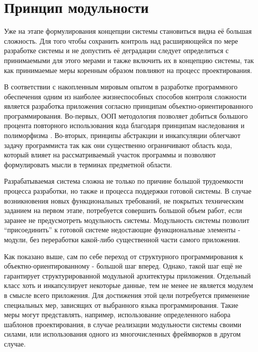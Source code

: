 \documentclass[14pt,oneside,final]{extreport}
\begin{document}
	\section{Принцип модульности}
	Уже на этапе формулирования концепции системы становиться видна её большая сложность. Для того чтобы сохранить контроль над расширяющейся по мере разработке системы и не допустить её деградации следует определиться с принимаемыми для этого мерами и также включить их в концепцию системы, так как принимаемые меры коренным образом повлияют на процесс проектирования. 
	
	В соответствии с накопленным мировым опытом в разработке программного обеспечения одним из наиболее жизнеспособных способов контроля сложности является разработка приложения согласно принципам  объектно-ориентированного программирования. Во-первых,  ООП методология позволяет добиться большого процента повторного использования кода благодаря принципам наследования и полиморфизма \cite{Shildt}. Во-вторых, принципы абстракции и инкапсуляции облегчают задачу программиста так как они существенно ограничивают область кода, который влияет на рассматриваемый участок программы и позволяют формулировать мысли в терминах предметной области. 
	
	Разрабатываемая система сложна не только по причине большой трудоемкости процесса разработки, но также и процесса поддержки готовой системы. В случае возникновения новых функциональных требований, не покрытых техническим заданием на первом этапе, потребуется совершить большой объем работ, если заранее не предусмотреть модульность системы. Модульность системы позволит “присоединить” к готовой системе недостающие функциональные элементы - модули, без переработки какой-либо существенной части самого приложения. 
	
	Как показано выше, сам по себе переход от структурного программирования к объектно-ориентированному - большой шаг вперед. Однако, такой шаг ещё не гарантирует структурированной модульной архитектуры приложения. Отдельный класс хоть и инкапсулирует некоторые данные, тем не менее не является модулем в смысле всего приложения. Для достижения этой цели потребуется применение специальных мер, зависящих от выбранного языка программирования. Такие меры могут представлять, например, использование определенного набора шаблонов проектирования, в случае реализации модульности системы своими силами, или использования одного из многочисленных фреймворков в другом случае.  

	
	
\end{document}

